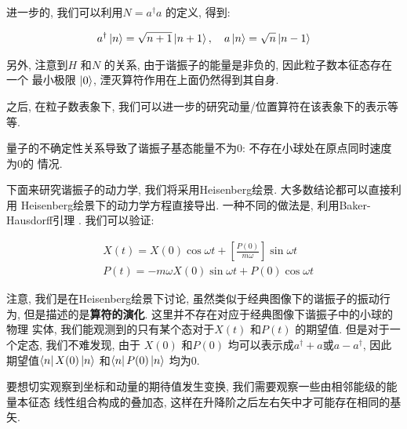 进一步的, 我们可以利用$N = a^{\dagger}a$ 的定义, 得到:

\begin{equation}
  \begin{aligned}
    a^{\dagger} \ket{n} = \sqrt{n+1} \ket{n+1},\quad a \ket{n} = \sqrt{n} \ket{n-1}
  \end{aligned}
\end{equation}

另外, 注意到$H$ 和$N$ 的关系, 由于谐振子的能量是非负的, 因此粒子数本征态存在一个
最小极限 $\ket{0}$, 湮灭算符作用在上面仍然得到其自身.

之后, 在粒子数表象下, 我们可以进一步的研究动量/位置算符在该表象下的表示等等.

\begin{remark}
  量子的不确定性关系导致了谐振子基态能量不为0: 不存在小球处在原点同时速度为0的
  情况.
\end{remark}

下面来研究谐振子的动力学, 我们将采用Heisenberg绘景. 大多数结论都可以直接利用
Heisenberg绘景下的动力学方程直接导出. 一种不同的做法是, 利用Baker-Hausdorff引理
. 我们可以验证:

\begin{equation}
  \begin{aligned}
    &X(t) = X(0) \cos \omega t + \left[ \frac{P(0)}{m \omega} \right] \sin \omega t\\
    &P(t) = - m \omega X(0) \sin \omega t + P(0) \cos \omega t
  \end{aligned}
\end{equation}

注意, 我们是在Heisenberg绘景下讨论, 虽然类似于经典图像下的谐振子的振动行为,
但是描述的是{\bf 算符的演化}. 这里并不存在对应于经典图像下谐振子中的小球的物理
实体, 我们能观测到的只有某个态对于$X(t)$ 和$P(t)$ 的期望值. 但是对于一个定态,
我们不难发现, 由于 $X(0)$ 和$P(0)$ 均可以表示成$a^{\dagger}+a$或$a - a^{\dagger}$,
因此期望值$\bra{n}X(0)\ket{n}$ 和$\bra{n}P(0)\ket{n}$ 均为0. 

要想切实观察到坐标和动量的期待值发生变换, 我们需要观察一些由相邻能级的能量本征态
线性组合构成的叠加态, 这样在升降阶之后左右矢中才可能存在相同的基矢.
